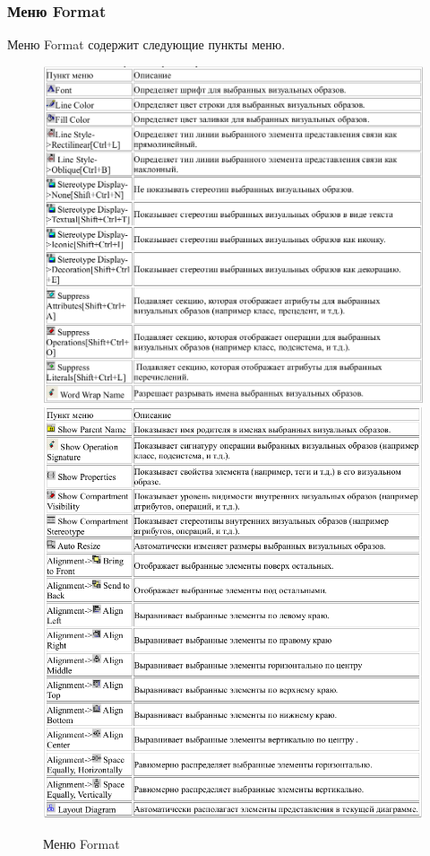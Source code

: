 \documentclass[a4paper,12pt]{report}
\begin{document}
\subsubsection*{Меню Format}
Меню Format содержит следующие пункты меню.
\begin{figure}[h!]
	\centering
	\includegraphics[width=0.7\linewidth]{images/formatmenu1}
	\includegraphics[width=0.7005\linewidth]{images/formatmenu2}
	\caption{Меню Format}
	\label{fig:formatmenu}
\end{figure}
\end{document}
